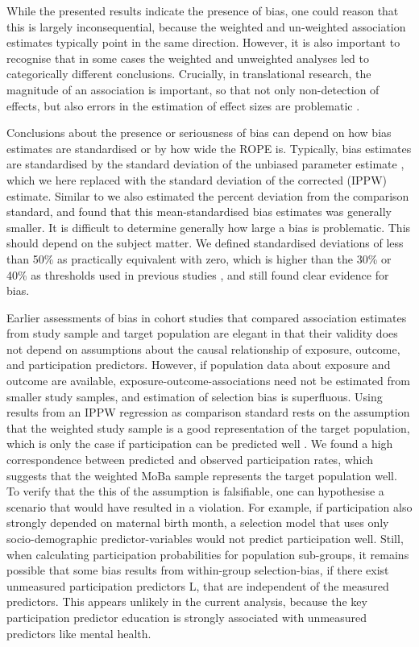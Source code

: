 \documentclass[12pt]{article}
\begin{document}
While the presented results indicate the presence of bias, one could reason that this is largely inconsequential, because the weighted and un-weighted association estimates typically point in the same direction. However, it is also important to recognise that in some cases the weighted and unweighted analyses led to categorically different conclusions. Crucially, in translational research, the magnitude of an association is important, so that not only non-detection of effects, but also errors in the estimation of effect sizes are problematic \cite{Sullivan2012-uc}.

Conclusions about the presence or seriousness of bias can depend on how bias estimates are standardised or by how wide the ROPE is. Typically, bias estimates are standardised by the standard deviation of the unbiased parameter estimate \cite{Austin2009-xk}, which we here replaced with the standard deviation of the corrected (IPPW) estimate. Similar to \citeauthor{Nilsen2009-ci} \cite{Nilsen2009-ci} we also estimated the percent deviation from the comparison standard, and found that this mean-standardised bias estimates was generally smaller. It is difficult to determine generally how large a bias is problematic. This should depend on the subject matter. We defined standardised deviations of less than 50\%  as practically equivalent with zero, which is higher than the 30\% or 40\% as thresholds used in previous studies \cite{Greene2011-am, Austin2009-xk}, and still found clear evidence for bias.

Earlier assessments of bias in cohort studies that compared association estimates from study sample and target population are elegant in that their validity does not depend on assumptions about the causal relationship of exposure, outcome, and participation predictors. However, if population data about exposure and outcome are available, exposure-outcome-associations need not be estimated from smaller study samples, and estimation of selection bias is superfluous. Using results from an IPPW regression as comparison standard rests on the assumption that the weighted study sample is a good representation of the target population, which is only the case if participation can be predicted well \cite{Seaman2013-rj}. We found a high correspondence between predicted and observed participation rates, which suggests that the weighted MoBa sample represents the target population well. To verify that the this of the assumption is falsifiable, one can hypothesise a scenario that would have resulted in a violation. For example, if participation also strongly depended on maternal birth month, a selection model that uses only socio-demographic predictor-variables would not predict participation well.  Still, when calculating participation probabilities for population sub-groups, it remains possible that some bias results from within-group selection-bias, if there exist unmeasured participation predictors L, that are independent of the measured predictors. This appears unlikely in the current analysis, because the key participation predictor education is strongly associated with unmeasured predictors like mental health.
\end{document}
